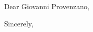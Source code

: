 \documentclass[10pt,letter]{letter}
\def\hm{Giovanni Provenzano} %
\begin{document}
\begin{letter}{}

\opening{Dear \hm,}

\setlength\parindent{.5in}





\raggedleft\closing{Sincerely,}
\end{letter}
\end{document}
